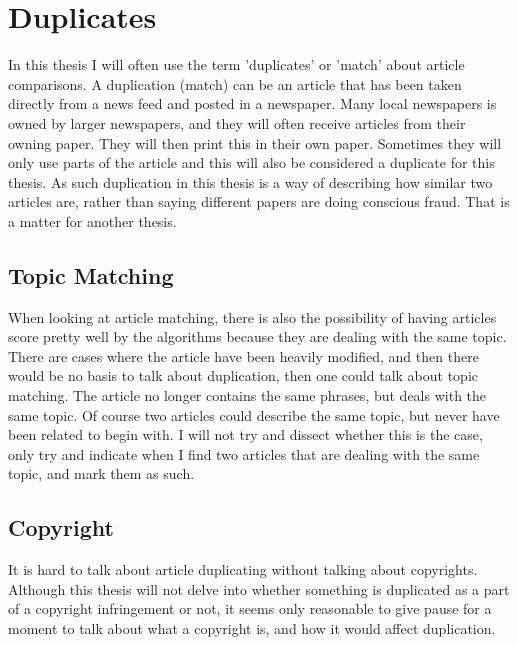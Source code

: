 \section{Duplicates}
In this thesis I will often use the term 'duplicates' or 'match' about article comparisons. A duplication (match) can be an article that has been taken directly from a news feed and posted in a newspaper. Many local newspapers is owned by larger newspapers, and they will often receive articles from their owning paper. They will then print this in their own paper. Sometimes they will only use parts of the article and this will also be considered a duplicate for this thesis. As such duplication in this thesis is a way of describing how similar two articles are, rather than saying different papers are doing conscious fraud. That is a matter for another thesis.

\subsection{Topic Matching}
When looking at article matching, there is also the possibility of having articles score pretty well by the algorithms because they are dealing with the same topic. There are cases where the article have been heavily modified, and then there would be no basis to talk about duplication, then one could talk about topic matching. The article no longer contains the same phrases, but deals with the same topic.
Of course two articles could describe the same topic, but never have been related to begin with. I will not try and dissect whether this is the case, only try and indicate when I find two articles that are dealing with the same topic, and mark them as such. 

\subsection{Copyright}
It is hard to talk about article duplicating without talking about copyrights. Although this thesis will not delve into whether something is duplicated as a part of a copyright infringement or not, it seems only reasonable to give pause for a moment to talk about what a copyright is, and how it would affect duplication.


